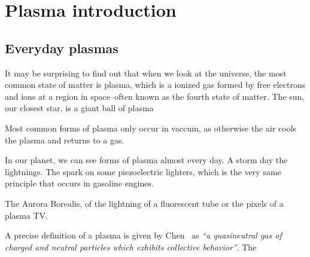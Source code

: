 \chapter{Plasma introduction}
\label{ch:plasma-intro}


\section{Everyday plasmas}

It may be surprising to find out that when we look at the universe, the most
common state of matter is plasma, which is a ionized gas formed by free
electrons and ions at a region in space--often known as the fourth state of
matter. The sun, our closest star, is a giant
ball of plasma 


Most common forms of plasma only occur in vaccum, as otherwise the air cools the
plasma and returns to a gas.

In our planet, we can see forms of plasma almost every day. A storm day the
lightnings. The spark on some piezoelectric lighters, which is the very same
principle that occurs in gasoline engines.

The Aurora Borealis, of the lightning of a fluorescent tube or the pixels of a
plasma TV.

A precise definition of a plasma is given by Chen~\cite{chen} as \textit{``a
quasineutral gas of charged and neutral particles which exhibits collective
behavior''}. The 
